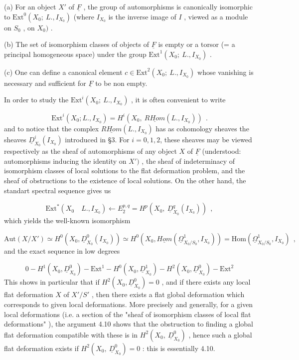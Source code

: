 (a)  For an object  $X'$  of  $\underline{F}$  , the group of automorphisms is canonically isomorphic to  $\mathrm{Ext}^0(X_0;\ L.,I_{X_0})$  (where  $I_{X_0}$  is the inverse image of  $I$  , viewed as a module on  $S_0$  , on  $X_0)$  .



(b)  The set of isomorphism classes of objects of  $\underline{F}$  is empty or a torsor (= a principal homogeneous space) under the group  $\mathrm{Ext}^1(X_0;\ L.,I_{X_0})$  .

(c)  One can define a canonical element  $c \in \mathrm{Ext}^2(X_0;\ L.,I_{X_0})$  whose vanishing is necessary and sufficient for  $\underline{F}$  to be non empty.

In order to study the  $\mathrm{Ext}^i(X_0;\ L.,I_{X_0})$  , it is often convenient to write

\begin{equation*}
\mathrm{Ext}^i(X_0;L.,I_{X_0}) = H^i(X_0,\ \underline{RHom}(L.,I_{X_0}))\ \ .
\end{equation*}
and to notice that the complex  $\underline{RHom}(L.,I_{X_0})$  has as cohomology sheaves the sheaves  $\underline{D}^i_{X_0}(I_{X_0})$  introduced in §3. For  $i = 0, 1, 2$,  these sheaves may be viewed respectively as the sheaf of automorphisms of any object  $X$  of  $\underline{F}$  (understood:  automorphisms inducing the identity on  $X')$  , the sheaf of indeterminacy of isomorphism classes of local solutions to the flat deformation problem, and the sheaf of obstructions to the existence of local solutions. On the other hand, the standart spectral sequence gives us

\begin{equation*}
\mathrm{Ext}^*(X_0 \quad L.,I_{X_0}) \leftarrow E_2^{p,q} = H^p(X_0,\ \underline{D}^q_{X_0}(I_{X_0}))\ \ ,
\end{equation*}
which yields the well-known isomorphism

\begin{equation*}
\mathrm{Aut}(X/X') \simeq H^0(X_0,\underline{D}^0_{X_0}(I_{X_0})) \simeq H^0(X_0,\underline{Hom}(\underline{\Omega}^1_{X_0/S_0},I_{X_0})) = \mathrm{Hom}(\underline{\Omega}^1_{X_0/S_0},I_{X_0})\ \ ,
\end{equation*}
and the exact sequence in low degrees

\begin{equation*}
0 - H^1(X_0,\underline{D}^0_{X_0}) - \mathrm{Ext}^1 - H^0(X_0,\underline{D}^1_{X_0}) - H^2(X_0,\underline{D}^0_{X_0}) - \mathrm{Ext}^2
\end{equation*}
This shows in particular that if  $H^2(X_0,\underline{D}^0_{X_0}) = 0$  , and if there exists any local flat deformation  $X$  of  $X'/S'$  , then there exists a flat global deformation which corresponds to given local deformations. More precisely and generally, for a given local deformations (i.e. a section of the  "sheaf of isomorphism classes of local flat deformations" ), the argument 4.10 shows that the obstruction to finding a global flat deformation compatible with these is in  $H^2(X_0,\ \underline{D}^0_{X_0})$  , hence such a global flat deformation exists if  $H^2(X_0,\ \underline{D}^0_{X_0}) = 0$  : this is essentially 4.10.




